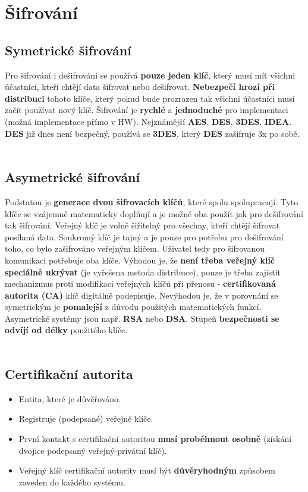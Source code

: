 \section{Šifrování}
\subsection{Symetrické šifrování}
Pro šifrování i dešifrování se používá \textbf{pouze jeden klíč}, který musí mít všichni účastníci, kteří chtějí data šifrovat nebo dešifrovat. \textbf{Nebezpečí hrozí při distribuci }tohoto klíče, který pokud bude prozrazen tak všichni účastníci musí začít používat nový klíč.  Šifrování je \textbf{rychlé} a \textbf{jednoduché} pro implementaci (možná implementace přímo v HW). Nejznámější \textbf{AES},   \textbf{DES}, \textbf{3DES}, \textbf{IDEA}. \textbf{DES} již dnes není bezpečný, používá se \textbf{3DES}, který \textbf{DES} zašifruje 3x po sobě.
\\\\
\noindent{}

\subsection{Asymetrické šifrování}
Podstatou je \textbf{generace dvou šifrovacích klíčů}, které spolu spolupracují. Tyto klíče se vzájemně matematicky doplňují a je možné oba použít jak pro dešifrování tak šifrování. Veřejný klíč je volně šiřitelný pro všechny, kteří chtějí šifrovat posílaná data. Soukromý klíč je tajný a je pouze pro potřebu pro dešifrování toho, co bylo zašifrováno veřejným klíčem. Uživatel tedy pro šifrovanou komunikaci potřebuje oba klíče. Výhodou je, že\textbf{ není třeba veřejný klíč speciálně ukrývat} (je vyřešena metoda distribuce), pouze je třeba zajistit mechanizmus proti modifikaci veřejných klíčů při přenosu - \textbf{certifikovaná autorita (CA)} klíč digitálně podepisuje. Nevýhodou je, že v porovnání se symetrickým je \textbf{pomalejší} z důvodu použitých matematických funkcí. Asymetrické systémy jsou např. \textbf{RSA} nebo \textbf{DSA}. Stupeň \textbf{bezpečnosti se odvíjí od délky} použitého klíče.
\\\\
\noindent{}


\subsection{Certifikační autorita}
\begin{itemize}
    \item Entita, které je důvěřováno.
    \item Registruje (podepsané) veřejné klíče.
    \item První kontakt s certifikační autoritou \textbf{musí proběhnout osobně }(získání dvojice podepsaný veřejný-privátní klíč).
    \item Veřejný klíč certifikační autority musí být \textbf{důvěryhodným} způsobem zaveden do každého systému.
\end{itemize}


